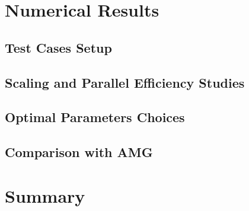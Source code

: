 \section{Numerical Results}
\label{sec:par_results}

\subsection{Test Cases Setup}

\subsection{Scaling and Parallel Efficiency Studies}

\subsection{Optimal Parameters Choices}

\subsection{Comparison with AMG}

\section{Summary}
\label{sec:par_summary}